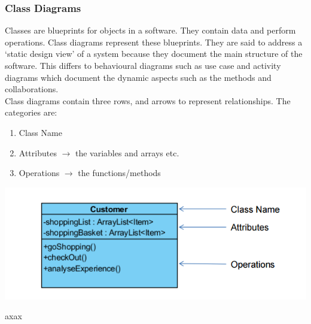\documentclass{article}
\begin{document}
\subsubsection{Class Diagrams}
Classes are blueprints for objects in a software. They contain data and perform operations. Class diagrams represent these blueprints. They are said to address a `static design view' of a system because they document the main structure of the software. This differs to behavioural diagrams such as use case and activity diagrams which document the dynamic aspects such as the methods and collaborations.
\\
Class diagrams contain three rows, and arrows to represent relationships. The categories are:
\begin{enumerate}
\item Class Name 
\item Attributes $\longrightarrow$ the variables and arrays etc.
\item Operations $\longrightarrow$ the functions/methods
\end{enumerate}

\includegraphics[scale = 0.6]{class1} %

\newpage
axax
\end{document}
